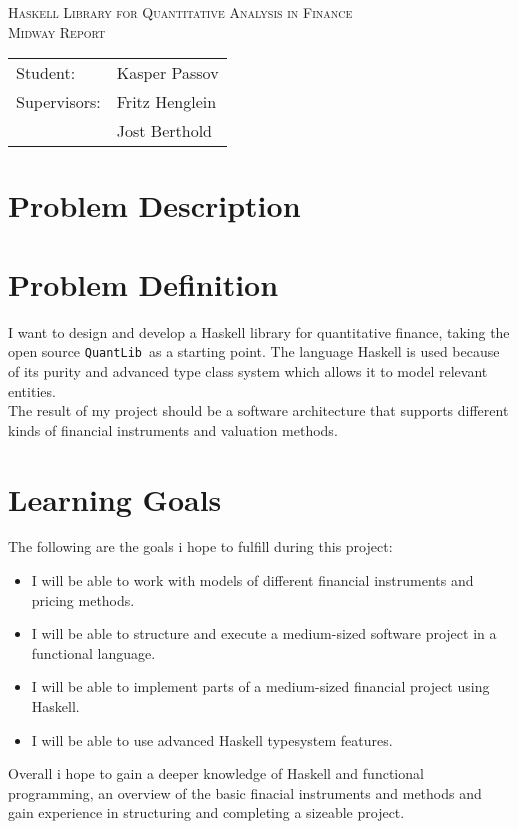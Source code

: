 \documentclass{article}
\newcommand{\QL}{\texttt{QuantLib}}
\begin{document}
\begin{titlepage}
\begin{center}
\textsc{\huge Haskell Library for Quantitative Analysis in Finance}\\[0.5cm]
\textsc{\Large Midway Report}\\[0.5cm]
\vspace{2 cm}
\begin{tabular}{ll}
Student: & Kasper Passov\\
Supervisors: & Fritz Henglein \\ 
             & Jost Berthold
\end{tabular}
\end{center}
\vspace{5 cm}
\newpage
\tableofcontents
\end{titlepage}

\section{Problem Description}

\section{Problem Definition}

I want to design and develop a Haskell library for 
quantitative finance, taking the open source \QL\ 
as a starting point. The language Haskell is used
because of its purity and advanced type class system
which allows it to model relevant entities.\\
The result of my project should be a software
architecture that supports different kinds of 
financial instruments and valuation methods.

\section{Learning Goals}
The following are the goals i hope to fulfill during this project:
\begin{itemize}
    \item {I will be able to work with models of different financial instruments and pricing methods.}
    \item {I will be able to structure and execute a medium-sized software project in a functional language.}
    \item {I will be able to implement parts of a medium-sized financial project using Haskell.}
    \item {I will be able to use advanced Haskell typesystem features.}
\end{itemize}
Overall i hope to gain a deeper knowledge of Haskell and functional programming, an overview of the basic finacial instruments
and methods and gain experience in structuring and completing a sizeable project.
\end{document}

